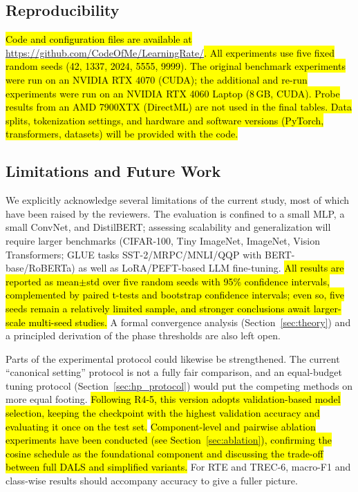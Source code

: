 \documentclass[a4paper,fleqn]{cas-dc}
\begin{document}
\subsection{Reproducibility}\label{sec:reproducibility}

\hl{Code and configuration files are available at }\url{https://github.com/CodeOfMe/LearningRate/}\hl{. All experiments use five fixed random seeds (42, 1337, 2024, 5555, 9999). The original benchmark experiments were run on an NVIDIA RTX 4070 (CUDA); the additional and re-run experiments were run on an NVIDIA RTX 4060 Laptop (8\,GB, CUDA). Probe results from an AMD 7900XTX (DirectML) are not used in the final tables. Data splits, tokenization settings, and hardware and software versions (PyTorch, transformers, datasets) will be provided with the code.}

\subsection{Limitations and Future Work}\label{sec:limitations}

We explicitly acknowledge several limitations of the current study, most of which have been raised by the reviewers. The evaluation is confined to a small MLP, a small ConvNet, and DistilBERT; assessing scalability and generalization will require larger benchmarks (CIFAR-100, Tiny ImageNet, ImageNet, Vision Transformers; GLUE tasks SST-2/MRPC/MNLI/QQP with BERT-base/RoBERTa) as well as LoRA/PEFT-based LLM fine-tuning. \hl{All results are reported as mean$\pm$std over five random seeds with 95\% confidence intervals, complemented by paired t-tests and bootstrap confidence intervals; even so, five seeds remain a relatively limited sample, and stronger conclusions await larger-scale multi-seed studies.} A formal convergence analysis (Section~\ref{sec:theory}) and a principled derivation of the phase thresholds are also left open.

Parts of the experimental protocol could likewise be strengthened. The current ``canonical setting'' protocol is not a fully fair comparison, and an equal-budget tuning protocol (Section~\ref{sec:hp_protocol}) would put the competing methods on more equal footing. \hl{Following R4-5, this version adopts validation-based model selection, keeping the checkpoint with the highest validation accuracy and evaluating it once on the test set.} \hl{Component-level and pairwise ablation experiments have been conducted (see Section~\mbox{\ref{sec:ablation}}), confirming the cosine schedule as the foundational component and discussing the trade-off between full DALS and simplified variants.} For RTE and TREC-6, macro-F1 and class-wise results should accompany accuracy to give a fuller picture.
\end{document}
